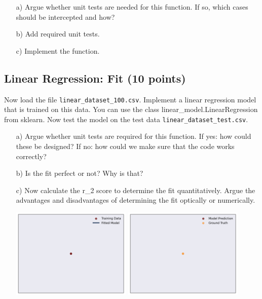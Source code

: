 \begin{enumerate}

\item[a)] Argue whether unit tests are needed for this function. If so, which cases should be intercepted and how?

\item[b)] Add required unit tests.

\item[c)] Implement the function.

\end{enumerate}

\subsection{Linear Regression: Fit (10 points)}

Now load the file \texttt{linear\_dataset\_100.csv}. Implement a linear regression model that is trained on this data. You can use the class linear\_model.LinearRegression from sklearn. Now test the model on the test data \texttt{linear\_dataset\_test.csv}.

\begin{enumerate}

\item[a)] Argue whether unit tests are required for this function. If yes: how could these be designed? If no: how could we make sure that the code works correctly?

\item[b)] Is the fit perfect or not? Why is that? 

\item[c)] Now calculate the r\_2 score to determine the fit quantitatively. Argue the advantages and disadvantages of determining the fit optically or numerically.

\includegraphics[width=0.45\textwidth]{source_code/goodfit_linear_model.png}
\includegraphics[width=0.45\textwidth]{source_code/goodfit_linear_testdata.png}

\end{enumerate}


